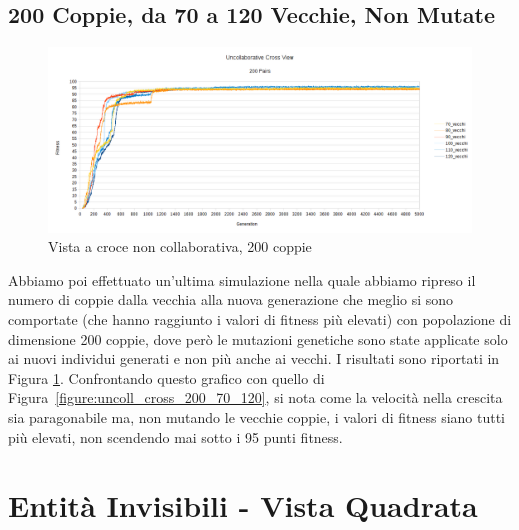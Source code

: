 \subsection{200 Coppie, da 70 a 120 Vecchie, Non Mutate}
\begin{figure}[ht]
	\centering
	\includegraphics[scale=0.7,angle=90]{imgs/uncollaborative_cross_200_pairs_70_120_vecchi_solo_nuovi_mutati.png}
	\caption{Vista a croce non collaborativa, 200 coppie}
	\label{figure:uncoll_cross_200_70_120_vecchi_non_mutati}
\end{figure}
Abbiamo poi effettuato un'ultima simulazione nella quale abbiamo ripreso il
numero di coppie dalla vecchia alla nuova generazione che meglio si sono
comportate (che hanno raggiunto i valori di fitness più elevati) con popolazione
di dimensione 200 coppie, dove però le mutazioni genetiche sono state applicate
solo ai nuovi individui generati e non più anche ai vecchi.\newline
I risultati sono riportati in Figura
\ref{figure:uncoll_cross_200_70_120_vecchi_non_mutati}. Confrontando questo
grafico con quello di Figura~\ref{figure:uncoll_cross_200_70_120}, si nota come
la velocità nella crescita sia paragonabile ma, non mutando le vecchie coppie, i
valori di fitness siano tutti più elevati, non scendendo mai sotto i 95 punti
fitness.



\clearpage



\section{Entità Invisibili - Vista Quadrata}
